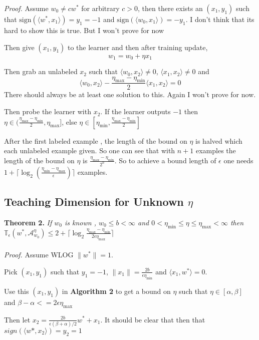\documentclass{article}
\newcommand{\learn}{\mathcal{A}_{w_0}^\eta}
\begin{document}
\textit{Proof.}
Assume $w_0 \neq cw^*$ for arbitrary $c > 0$, then there exists an $(x_1, y_1)$ such that $\text{sign}(\langle w^*,x_1 \rangle) = y_1 = -1$ and $\text{sign}(\langle w_0,x_1 \rangle) = -y_1$.
\color{red}
I don't think that its hard to show this is true. But I won't prove for now
\color{black}

Then give $(x_1, y_1)$ to the learner and then after training update,
$$
w_1 = w_0 + \eta x_1
$$

Then grab an unlabeled $x_2$ such that
$\langle w_0,x_2 \rangle \neq 0$, $\langle x_1, x_2 \rangle \neq 0$
and 
$$
\langle w_0,x_2 \rangle - \frac{\eta_{\max} - \eta_{\min}}{2} \langle x_1, x_2 \rangle = 0
$$
\color{red}
There should always be at least one solution to this. Again I won't prove for now.
\color{black}


Then probe the learner with $x_2$. If the learner outputs $-1$ then
$\eta \in (\frac{\eta_{\max} - \eta_{\min}}{2} , \eta_{\max}]$, else 
$\eta \in [\eta_{\min},\frac{\eta_{\max} - \eta_{\min}}{2}]$

After the first labeled example , the length of the bound on $\eta$ is halved which each unlabeled example given. So one can see that with $n + 1$ examples the length of the bound on $\eta$ is $\frac{\eta_{\max} - \eta_{\min}}{2 ^ n }$. So to achieve a bound length of $\epsilon$ one needs
$ 1 + \lceil \log_2 ( \frac{\eta_
{\min} - \eta_{\max}}{\epsilon} ) \rceil$ examples.

\subsection{Teaching Dimension for Unknown $\eta$}

\textbf{Theorem 2.}
\textit{ If $w_0$ is known , $w_0 \leq b < \infty$ and $ 0 < \eta_{\min} \leq \eta \leq \eta_{\max} < \infty$ 
then $\mathbb{T}_{\epsilon}(w^*, \learn)  \leq 2 + \lceil \log_2 \frac{\eta_{\max} - \eta_{\min}}{2\epsilon\eta_{\max}}  \rceil$
}
\\
\\
\textit{Proof.}
Assume WLOG $\lVert w^* \rVert = 1$.

Pick $(x_1,y_1)$ such that $y_1 = -1$, $\lVert x_1 \rVert = \frac{2 b}{\epsilon \eta_{\min}}$ and $\langle x_1 , w^* \rangle = 0$.

Use this $(x_1, y_1)$ in \textbf{Algorithm 2} to get a bound on $\eta$ such that $\eta \in [\alpha , \beta]$ and $\beta - \alpha <= 2\epsilon \eta_{\max}$

Then let $x_2 = \frac{2 b}{\epsilon (\beta + \alpha)/2}w^* + x_1$.
It should be clear that then that $sign(\langle w* , x_2 \rangle) =  y_2 = 1$
\end{document}

